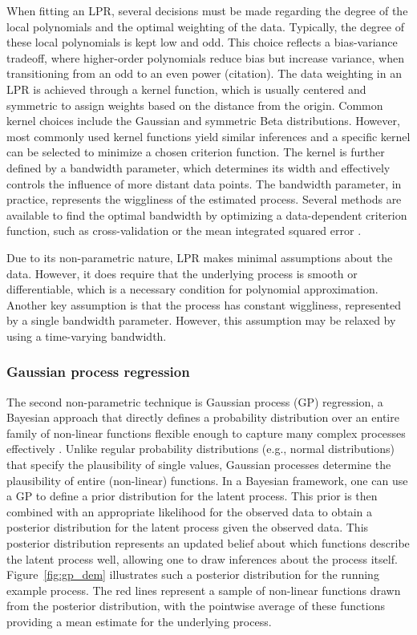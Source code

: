 \documentclass[man, floatsintext]{apa7}
\begin{document}
When fitting an LPR, several decisions must be
made regarding the degree of the local polynomials and the optimal weighting of
the data. Typically, the degree of these local polynomials is kept low and odd.
This choice reflects a bias-variance tradeoff, where higher-order polynomials
reduce bias but increase variance, when transitioning from an odd
to an even power (citation). The data weighting in an LPR is achieved through a
kernel function, which is usually centered and symmetric to assign weights
based
on the distance from the origin. Common kernel choices include the Gaussian and
symmetric Beta distributions. However, most commonly used kernel functions
yield similar
inferences and a specific kernel can be selected to minimize a chosen criterion
function. The kernel is further defined by a bandwidth
parameter, which determines its width and effectively controls the influence of
more distant data points. The bandwidth parameter, in practice, represents the
wiggliness of the estimated process.
Several methods are available to find the optimal bandwidth by optimizing a
data-dependent criterion function, such as cross-validation or the mean
integrated squared error \parencite{kohler_review_2014, debruyne_model_2008}.

Due to its non-parametric nature, LPR makes minimal assumptions about the data.
However, it does require that the underlying process is smooth or
differentiable, which is
a necessary condition for polynomial approximation.
Another key assumption is that the process has constant
wiggliness, represented by a single bandwidth parameter. However,
this assumption may be relaxed by using a time-varying bandwidth.

\subsubsection{Gaussian process regression}

The second non-parametric technique is Gaussian process (GP) regression, a
Bayesian approach that directly defines a probability distribution over an
entire family of non-linear functions flexible enough to capture many complex
processes effectively \parencite{rasmussen_gaussian_2006,
  betancourt_robust_2020, roberts_gaussian_2013}. Unlike regular probability
distributions (e.g., normal distributions) that specify the plausibility of
single values, Gaussian processes determine the plausibility of entire
(non-linear) functions. In a Bayesian framework, one can use a GP to define
a prior distribution for the latent process. This prior is then combined
with an appropriate likelihood for the observed data to obtain a posterior
distribution for the latent process given the observed data.
This posterior distribution represents an updated belief about which functions
describe the latent process well, allowing one to draw inferences about the
process itself. Figure~\ref{fig:gp_dem} illustrates such a posterior
distribution for the running
example process. The red lines represent a sample of non-linear functions
drawn from the posterior distribution, with the pointwise average of these
functions providing a mean estimate for the underlying process.
\end{document}
